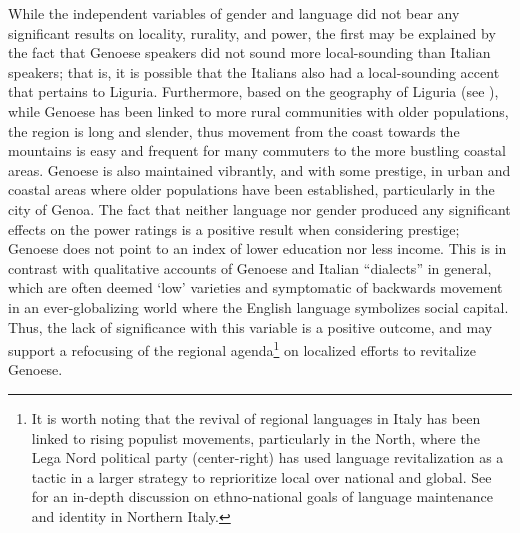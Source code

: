 \documentclass[output=paper,colorlinks,citecolor=brown]{langscibook}
\begin{document}
\par While the independent variables of gender and language did not bear any significant results on locality, rurality, and power, the first may be explained by the fact that Genoese speakers did not sound more local-sounding than Italian speakers; that is, it is possible that the Italians also had a local-sounding accent that pertains to Liguria. Furthermore, based on the geography of Liguria (see ), while Genoese has been linked to more rural communities with older populations, the region is long and slender, thus movement from the coast towards the mountains is easy and frequent for many commuters to the more bustling coastal areas. Genoese is also maintained vibrantly, and with some prestige, in urban and coastal areas where older populations have been established, particularly in the city of Genoa. The fact that neither language nor gender produced any significant effects on the power ratings is a positive result when considering prestige; Genoese does not point to an index of lower education nor less income. This is in contrast with qualitative accounts of Genoese and Italian “dialects” in general, which are often deemed ‘low’ varieties \citep{colu09} and symptomatic of backwards movement in an ever-globalizing world where the English language symbolizes social capital. Thus, the lack of significance with this variable is a positive outcome, and may support a refocusing of the regional agenda\footnote{It is worth noting that the revival of regional languages in Italy has been linked to rising populist movements, particularly in the North, where the Lega Nord political party (center-right) has used language revitalization as a tactic in a larger strategy to reprioritize local over national and global. See \cite{ruzz08} for an in-depth discussion on ethno-national goals of language maintenance and identity in Northern Italy.}  on localized efforts to revitalize Genoese.
\end{document}
